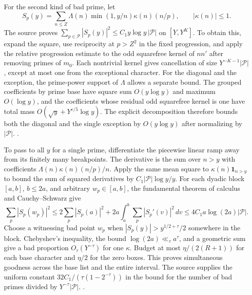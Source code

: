 For the second kind of bad prime, let
\[
 S_p(y)=\sum_{n\le Z}\Lambda(n)\min(1,y/n)\kappa(n)(n/p),\qquad |\kappa(n)|\le1.
\]
The source proves \(\sum_{p\in\mathcal P}|S_p(y)|^2\le C_1 y\log y\,|\mathcal P|\) on \([Y,Y^K]\). To obtain this, expand the square, use reciprocity at \(p>Z^2\) in the fixed progression, and apply the relative progression estimate to the odd squarefree kernel of \(nn'\) after removing primes of \(m_0\). Each nontrivial kernel gives cancellation of size \(Y^{-K-1}|\mathcal P|\), except at most one from the exceptional character. For the diagonal and the exception, the prime-power support of \(\Lambda\) allows a separate bound. The grouped coefficients by prime base have square sum \(O(y\log y)\) and maximum \(O(\log y)\), and the coefficients whose residual odd squarefree kernel is one have total mass \(O(\sqrt y+Y^{\varepsilon/5}\log y)\). The explicit decomposition therefore bounds both the diagonal and the single exception by \(O(y\log y)\) after normalizing by \(|\mathcal P|\). \quad
{}\quad
{}.

To pass to all \(y\) for a single prime, differentiate the piecewise linear ramp away from its finitely many breakpoints. The derivative is the sum over \(n>y\) with coefficients \(\Lambda(n)\kappa(n)(n/p)/n\). Apply the same mean square to \(\kappa(n)\mathbf1_{n>y}\) to bound the sum of squared derivatives by \(C_1|\mathcal P|\log y/y\). For each dyadic block \([a,b]\), \(b\le2a\), and arbitrary \(w_p\in[a,b]\), the fundamental theorem of calculus and Cauchy--Schwarz give
\[
 \sum_p |S_p(w_p)|^2
 \le 2\sum_p|S_p(a)|^2+2a\int_a^b\sum_p|S_p'(v)|^2\,dv
 \le 4C_1a\log(2a)|\mathcal P|.
\]
Choose a witnessing bad point \(w_p\) when \(|S_p(y)|>y^{1/2+\tau}/2\) somewhere in the block. Chebyshev's inequality, the bound \(\log(2a)\ll_\tau a^\tau\), and a geometric sum give a bad proportion \(O_\tau(Y^{-\tau})\) for one \(\kappa\). Budget at most \(\eta/(2(R+1))\) for each base character and \(\eta/2\) for the zero boxes. This proves simultaneous goodness across the base list and the entire interval. The source supplies the uniform constant \(32C_1/(\tau(1-2^{-\tau}))\) in the bound for the number of bad primes divided by \(Y^{-\tau}|\mathcal P|\). \quad
{}\quad
{}.

